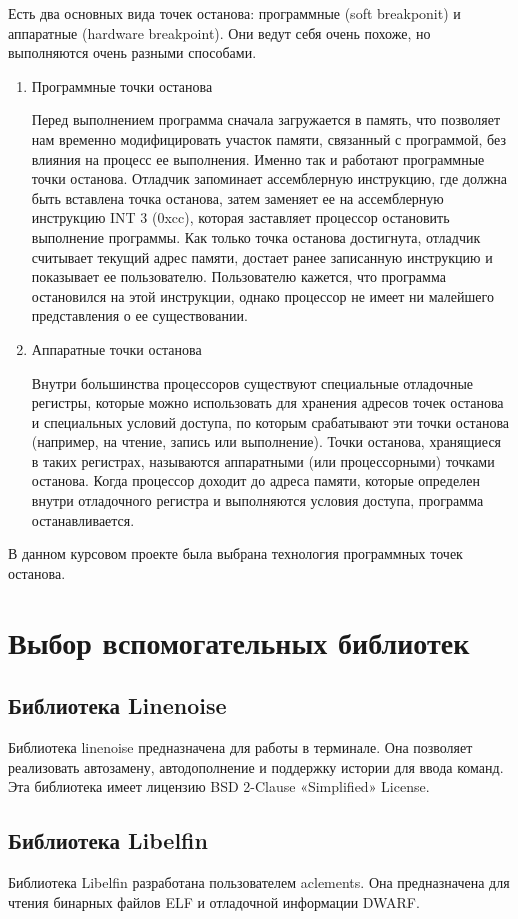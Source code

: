 \documentclass[a4paper,14pt,oneside]{extreport}  %
\begin{document}
Есть два основных вида точек останова: программные (soft breakponit) и аппаратные (hardware breakpoint). Они ведут себя очень похоже, но выполняются очень разными способами.
\begin{enumerate}
	\item Программные точки останова
	
	Перед выполнением программа сначала загружается в память, что позволяет нам временно модифицировать участок памяти, связанный с программой, без влияния на процесс ее выполнения. Именно так и работают программные точки останова. Отладчик запоминает ассемблерную инструкцию, где должна быть вставлена точка останова, затем заменяет ее на ассемблерную инструкцию INT 3 (0xcc), которая заставляет процессор остановить выполнение программы. Как только точка останова достигнута, отладчик считывает текущий адрес памяти, достает ранее записанную инструкцию и показывает ее пользователю. Пользователю кажется, что программа остановился на этой инструкции, однако процессор не имеет ни малейшего представления о ее существовании.
	\item Аппаратные точки останова
	
	Внутри большинства процессоров существуют специальные отладочные регистры, которые можно использовать для хранения адресов точек останова и специальных условий доступа, по которым срабатывают эти точки останова (например, на чтение, запись или выполнение). Точки останова, хранящиеся в таких регистрах, называются аппаратными (или процессорными) точками останова. Когда процессор доходит до адреса памяти, которые определен внутри отладочного регистра и выполняются условия доступа, программа останавливается.
\end{enumerate}

В данном курсовом проекте была выбрана технология программных точек останова. 
\section {Выбор вспомогательных библиотек}
\subsection{Библиотека Linenoise}
Библиотека linenoise предназначена для работы в терминале. Она позволяет реализовать автозамену, автодополнение и поддержку истории для ввода команд. Эта библиотека имеет лицензию BSD 2-Clause «Simplified» License.
\subsection{Библиотека Libelfin}
Библиотека Libelfin разработана пользователем aclements.
Она предназначена для чтения бинарных файлов ELF и отладочной информации DWARF.
\end{document}

